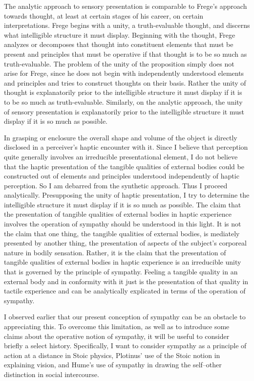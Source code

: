 The analytic approach to sensory presentation is comparable to Frege's approach towards thought, at least at certain stages of his career, on certain interpretations. Frege begins with a unity, a truth-evaluable thought, and discerns what intelligible structure it must display. Beginning with the thought, Frege analyzes or decomposes that thought into constituent elements that must be present and principles that must be operative if that thought is to be so much as truth-evaluable. The problem of the unity of the proposition simply does not arise for Frege, since he does not begin with independently understood elements and principles and tries to construct thoughts on their basis. Rather the unity of thought is explanatorily prior to the intelligible structure it must display if it is to be so much as truth-evaluable. Similarly, on the analytic approach, the unity of sensory presentation is explanatorily prior to the intelligible structure it must display if it is so much as possible.

In grasping or enclosure the overall shape and volume of the object is directly disclosed in a perceiver's haptic encounter with it. Since I believe that perception quite generally involves an irreducible presentational element, I do not believe that the haptic presentation of the tangible qualities of external bodies could be constructed out of elements and principles understood independently of haptic perception. So I am debarred from the synthetic approach. Thus I proceed analytically. Presupposing the unity of haptic presentation, I try to determine the intelligible structure it must display if it is so much as possible. The claim that the presentation of tangible qualities of external bodies in haptic experience involves the operation of sympathy should be understood in this light. It is not the claim that one thing, the tangible qualities of external bodies, is mediately presented by another thing, the presentation of aspects of the subject's corporeal nature in bodily sensation. Rather, it is the claim that the presentation of tangible qualities of external bodies in haptic experience is an irreducible unity that is governed by the principle of sympathy. Feeling a tangible quality in an external body and in conformity with it just is the presentation of that quality in tactile experience and can be analytically explicated in terms of the operation of sympathy.

I observed earlier that our present conception of sympathy can be an obstacle to appreciating this. To overcome this limitation, as well as to introduce some claims about the operative notion of sympathy, it will be useful to consider briefly a select history. Specifically, I want to consider sympathy as a principle of action at a distance in Stoic physics, Plotinus' use of the Stoic notion in explaining vision, and Hume's use of sympathy in drawing the self--other distinction in social intercourse. 

